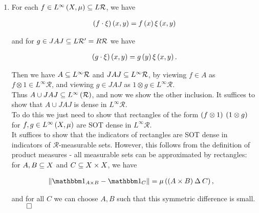 \documentclass[a4paper,10pt]{report}
\begin{document}
\begin{enumerate}
              \item For each $f \in L^\infty \left( X , \mu \right) \subseteq L \mathcal R$, we have

                \begin{align*}
                  \left( f \cdot \xi \right) \left( x , y \right) = f \left( x \right) \xi \left( x , y \right)
                \end{align*}

                and for $g \in J A J \subseteq L \mathcal R' = R \mathcal R$ we have

                \begin{align*}
                  \left( g \cdot \xi \right) \left( x , y \right) = g \left( y \right) \xi \left( x , y \right).
                \end{align*}

                Then we have $A \subseteq L^\infty \mathcal R$ and $J A J \subseteq L^\infty \mathcal R$, by viewing $f \in A$ as $f \otimes 1 \in L^\infty \mathcal R$, and viewing $g \in J A J$ as $1 \otimes g \in L^\infty \mathcal R$.\\
                Thus $A \cup J A J \subseteq L^\infty \left( \mathcal R \right)$, and now we show the other inclusion.  It suffices to show that $A \cup J A J$ is dense in $L^\infty \mathcal R$.\\
                To do this we just need to show that rectangles of the form $\left( f \otimes 1 \right)$ $\left( 1 \otimes g \right)$ for $f , g \in L^\infty \left( X , \mu \right)$ are SOT dense in $L^\infty \mathcal R$.\\
                It suffices to show that the indicators of rectangles are SOT dense in indicators of $\mathcal R$-measurable sets.  However, this follows from the definition of product measures - all measurable sets can be approximated by rectangles: for $A , B \subseteq X$ and $C \subseteq X \times X$, we have

                \begin{align*}
                  \NK \mathbbm 1_{A \times B} - \mathbbm 1_C \KN%
                  &= \mu \E \E A \times B \R \symdif C \R,
                \end{align*}

                and for all $C$ we can choose $A , B$ such that this symmetric difference is small.\\
                $\qed$
\end{enumerate}
\end{document}
